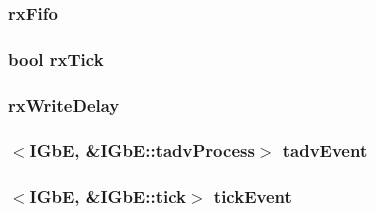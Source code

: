 \label{classIGbE_aa8031223419e9d8480a99fae1f2de778}
\hypertarget{classIGbE_a45c9c6a3665bcd91e57ff35aa9089fa7}{
\subsubsection[{rxFifo}]{ {\bf rxFifo}}}
\label{classIGbE_a45c9c6a3665bcd91e57ff35aa9089fa7}
\hypertarget{classIGbE_a3dd1ff20ea750ba74f718ba7e7c210fe}{
\subsubsection[{rxTick}]{\setlength{\rightskip}{0pt plus 5cm}bool {\bf rxTick}}}
\label{classIGbE_a3dd1ff20ea750ba74f718ba7e7c210fe}
\hypertarget{classIGbE_a94231b5b6ec824655f1e33a2481009fb}{
\subsubsection[{rxWriteDelay}]{ {\bf rxWriteDelay}}}
\label{classIGbE_a94231b5b6ec824655f1e33a2481009fb}
\hypertarget{classIGbE_a52af2948f0bdbd05624c9f1e90872556}{
\subsubsection[{tadvEvent}]{$<${\bf IGbE}, \&IGbE::tadvProcess$>$ {\bf tadvEvent}}}
\label{classIGbE_a52af2948f0bdbd05624c9f1e90872556}
\hypertarget{classIGbE_a13b02e56360d63f349a514edb321bd9c}{
\subsubsection[{tickEvent}]{$<${\bf IGbE}, \&IGbE::tick$>$ {\bf tickEvent}}}
